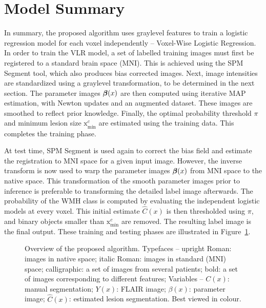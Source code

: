 \section{Model Summary}
In summary, the proposed algorithm uses graylevel features
to train a logistic regression model for each voxel independently -- Voxel-Wise Logistic Regression.
In order to train the VLR model,
a set of labelled training images must first be registered to a standard brain space (MNI).
This is achieved using the SPM Segment tool, which also produces bias corrected images.
Next, image intensities are standardized using a graylevel transformation,
to be determined in the next section.
The parameter images $\bm{\beta}(x)$ are then computed using iterative MAP estimation,
with Newton updates and an augmented dataset.
These images are smoothed to reflect prior knowledge.
Finally, the optimal probability threshold $\pi$
and minimum lesion size $\mathrm{x}_{\min}^{c}$
are estimated using the training data.
This completes the training phase.
\par
At test time, SPM Segment is used again to
correct the bias field and estimate the registration to MNI space for a given input image.
However, the inverse transform is now used to warp the parameter images $\bm{\beta}(x)$
from MNI space to the native space.
This transformation of the smooth parameter images prior to inference is preferable
to transforming the detailed label image afterwards.
The probability of the WMH class is computed
by evaluating the independent logistic models at every voxel.
This initial estimate $\hat{C}(x)$ is then thresholded using $\pi$,
and binary objects smaller than $\mathrm{x}_{\min}^{c}$ are removed.
The resulting label image is the final output.
These training and testing phases are illustrated in Figure~\ref{fig:modelsum}.
\begin{figure}
  \centering\scalebox{0.65}{}
  \caption{Overview of the proposed algorithm.
    Typefaces --
    upright Roman: images in native space;
    italic Roman: images in standard (MNI) space;
    calligraphic: a set of images from several patients;
    bold: a set of images corresponding to different features;
    Variables --
    $C(x)$: manual segmentation;
    $Y(x)$: FLAIR image;
    $\beta(x)$: parameter image;
    $\hat{C}(x)$: estimated lesion segmentation.
    Best viewed in colour.}%
  \label{fig:modelsum}
\end{figure}
